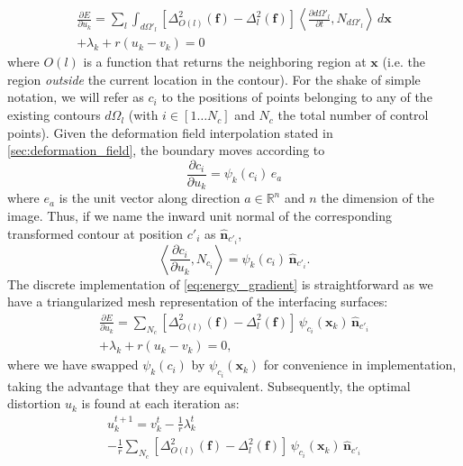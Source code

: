 \begin{multline}
\frac{\partial E}{\partial u_k} = \sum\limits_l \int_{d\Omega'_l} \left[ \Delta^2_{O(l)} (\mathbf{f}) - \Delta^2_l (\mathbf{f}) \right]
\left\langle\frac{\partial{d\Omega'_l}}{\partial t}, N_{d\Omega'_l}\right\rangle \,d\mathbf{x} \\
+ \lambda_k + r(u_k - v_k) = 0
\label{eq:energy_gradient}
\end{multline}
where $O(l)$ is a function that returns the neighboring region at $\mathbf{x}$ (i.e.
the region \emph{outside} the current location in the contour). For the shake of
simple notation, we will refer as $c_i$ to the positions 
of points belonging to any of the existing contours $d\Omega_l$ (with 
$i \in [1 \ldots N_c]$ and $N_c$ the total number of control points).
Given the deformation field interpolation stated in \autoref{sec:deformation_field}, 
the boundary moves according to
\begin{equation}
\frac{\partial c_i}{\partial u_k} = \psi_k(c_i)\,e_a
\end{equation}
where $e_a$ is the unit vector along direction $a \in \mathbb{R}^n$ and $n$ the dimension
of the image. Thus, if we name the inward unit normal of the corresponding transformed 
contour at position $c'_i$ as $\hat{\mathbf{n}}_{c'_i}$,
\begin{equation}
\left\langle\frac{\partial c_i}{\partial u_k}, N_{c_i}\right\rangle = \psi_k(c_i)\,\hat{\mathbf{n}}_{c'_i}.
\end{equation}
The discrete implementation of \eqref{eq:energy_gradient} is straightforward as
we have a triangularized mesh representation of the interfacing surfaces:
\begin{multline}
\frac{\partial E}{\partial u_k} = \sum\limits_{N_c} \left[ \Delta^2_{O(l)} (\mathbf{f}) - \Delta^2_l (\mathbf{f}) \right]
\, \psi_{c_i}(\mathbf{x}_k)\,\hat{\mathbf{n}}_{c'_i} \\
+ \lambda_k + r(u_k - v_k) = 0,
\label{eq:discrete_energy_gradient}
\end{multline}
where we have swapped $\psi_k(c_i)$ by $\psi_{c_i}(\mathbf{x}_k)$ for
convenience in implementation, taking the advantage that they are
equivalent. Subsequently, the optimal distortion $u_k$ 
is found at each iteration as:
\begin{multline}
u_k^{t+1} = v_k^t - \frac{1}{r}\lambda_k^{t} \\
- \frac{1}{r} \sum\limits_{N_c} \left[ \Delta^2_{O(l)} (\mathbf{f}) - \Delta^2_l (\mathbf{f}) \right]
\, \psi_{c_i}(\mathbf{x}_k)\,\hat{\mathbf{n}}_{c'_i}
\label{eq:update_u}
\end{multline}


